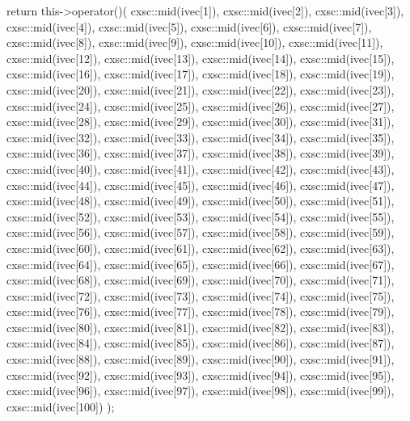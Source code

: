 \begin{DoxyCode}
{
  return this->operator()(
  cxsc::mid(ivec[1]),
  cxsc::mid(ivec[2]),
  cxsc::mid(ivec[3]),
  cxsc::mid(ivec[4]),
  cxsc::mid(ivec[5]),
  cxsc::mid(ivec[6]),
  cxsc::mid(ivec[7]),
  cxsc::mid(ivec[8]),
  cxsc::mid(ivec[9]),
  cxsc::mid(ivec[10]),
  cxsc::mid(ivec[11]),
  cxsc::mid(ivec[12]),
  cxsc::mid(ivec[13]),
  cxsc::mid(ivec[14]),
  cxsc::mid(ivec[15]),
  cxsc::mid(ivec[16]),
  cxsc::mid(ivec[17]),
  cxsc::mid(ivec[18]),
  cxsc::mid(ivec[19]),
  cxsc::mid(ivec[20]),
  cxsc::mid(ivec[21]),
  cxsc::mid(ivec[22]),
  cxsc::mid(ivec[23]),
  cxsc::mid(ivec[24]),
  cxsc::mid(ivec[25]),
  cxsc::mid(ivec[26]),
  cxsc::mid(ivec[27]),
  cxsc::mid(ivec[28]),
  cxsc::mid(ivec[29]),
  cxsc::mid(ivec[30]),
  cxsc::mid(ivec[31]),
  cxsc::mid(ivec[32]),
  cxsc::mid(ivec[33]),
  cxsc::mid(ivec[34]),
  cxsc::mid(ivec[35]),
  cxsc::mid(ivec[36]),
  cxsc::mid(ivec[37]),
  cxsc::mid(ivec[38]),
  cxsc::mid(ivec[39]),
  cxsc::mid(ivec[40]),
  cxsc::mid(ivec[41]),
  cxsc::mid(ivec[42]),
  cxsc::mid(ivec[43]),
  cxsc::mid(ivec[44]),
  cxsc::mid(ivec[45]),
  cxsc::mid(ivec[46]),
  cxsc::mid(ivec[47]),
  cxsc::mid(ivec[48]),
  cxsc::mid(ivec[49]),
  cxsc::mid(ivec[50]),
  cxsc::mid(ivec[51]),
  cxsc::mid(ivec[52]),
  cxsc::mid(ivec[53]),
  cxsc::mid(ivec[54]),
  cxsc::mid(ivec[55]),
  cxsc::mid(ivec[56]),
  cxsc::mid(ivec[57]),
  cxsc::mid(ivec[58]),
  cxsc::mid(ivec[59]),
  cxsc::mid(ivec[60]),
  cxsc::mid(ivec[61]),
  cxsc::mid(ivec[62]),
  cxsc::mid(ivec[63]),
  cxsc::mid(ivec[64]),
  cxsc::mid(ivec[65]),
  cxsc::mid(ivec[66]),
  cxsc::mid(ivec[67]),
  cxsc::mid(ivec[68]),
  cxsc::mid(ivec[69]),
  cxsc::mid(ivec[70]),
  cxsc::mid(ivec[71]),
  cxsc::mid(ivec[72]),
  cxsc::mid(ivec[73]),
  cxsc::mid(ivec[74]),
  cxsc::mid(ivec[75]),
  cxsc::mid(ivec[76]),
  cxsc::mid(ivec[77]),
  cxsc::mid(ivec[78]),
  cxsc::mid(ivec[79]),
  cxsc::mid(ivec[80]),
  cxsc::mid(ivec[81]),
  cxsc::mid(ivec[82]),
  cxsc::mid(ivec[83]),
  cxsc::mid(ivec[84]),
  cxsc::mid(ivec[85]),
  cxsc::mid(ivec[86]),
  cxsc::mid(ivec[87]),
  cxsc::mid(ivec[88]),
  cxsc::mid(ivec[89]),
  cxsc::mid(ivec[90]),
  cxsc::mid(ivec[91]),
  cxsc::mid(ivec[92]),
  cxsc::mid(ivec[93]),
  cxsc::mid(ivec[94]),
  cxsc::mid(ivec[95]),
  cxsc::mid(ivec[96]),
  cxsc::mid(ivec[97]),
  cxsc::mid(ivec[98]),
  cxsc::mid(ivec[99]),
  cxsc::mid(ivec[100])
  );
}
\end{DoxyCode}
